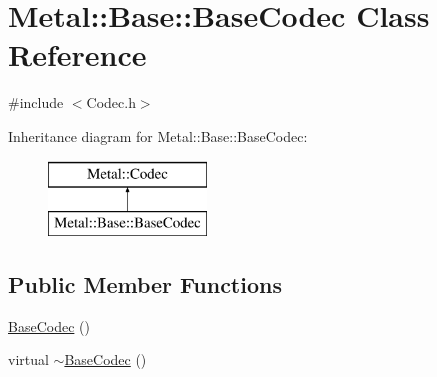 \hypertarget{classMetal_1_1Base_1_1BaseCodec}{}\section{Metal\+:\+:Base\+:\+:Base\+Codec Class Reference}
\label{classMetal_1_1Base_1_1BaseCodec}


{\ttfamily \#include $<$Codec.\+h$>$}

Inheritance diagram for Metal\+:\+:Base\+:\+:Base\+Codec\+:\begin{figure}[H]
\begin{center}
\leavevmode
\includegraphics[height=2.000000cm]{classMetal_1_1Base_1_1BaseCodec}
\end{center}
\end{figure}
\subsection*{Public Member Functions}
\begin{DoxyCompactItemize}
\item 
\hyperlink{classMetal_1_1Base_1_1BaseCodec_afc95b15c33e4ea76965d23652c107a78}{Base\+Codec} ()
\item 
virtual \hyperlink{classMetal_1_1Base_1_1BaseCodec_af6595e9626b1b3b7ede78387a3090fa2}{$\sim$\+Base\+Codec} ()
\end{DoxyCompactItemize}
